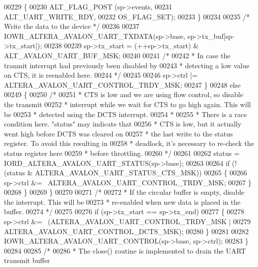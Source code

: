 \begin{DoxyCode}
00229       \{ 
00230         ALT_FLAG_POST (sp->events, 
00231                        ALT_UART_WRITE_RDY,
00232                        OS\_FLAG\_SET);
00233       \}
00234 
00235       \textcolor{comment}{/* Write the data to the device */}
00236 
00237       IOWR_ALTERA_AVALON_UART_TXDATA(sp->base, sp->tx_buf[sp->tx_start]);
00238 
00239       sp->tx_start = (++sp->tx_start) & ALT_AVALON_UART_BUF_MSK;
00240 
00241       \textcolor{comment}{/*}
00242 \textcolor{comment}{       * In case the tranmit interrupt had previously been disabled by }
00243 \textcolor{comment}{       * detecting a low value on CTS, it is reenabled here.}
00244 \textcolor{comment}{       */} 
00245 
00246       sp->ctrl |= ALTERA_AVALON_UART_CONTROL_TRDY_MSK;
00247     \}
00248     \textcolor{keywordflow}{else}
00249     \{
00250       \textcolor{comment}{/*}
00251 \textcolor{comment}{       * CTS is low and we are using flow control, so disable the transmit}
00252 \textcolor{comment}{       * interrupt while we wait for CTS to go high again. This will be }
00253 \textcolor{comment}{       * detected using the DCTS interrupt.}
00254 \textcolor{comment}{       *}
00255 \textcolor{comment}{       * There is a race condition here. "status" may indicate that }
00256 \textcolor{comment}{       * CTS is low, but it actually went high before DCTS was cleared on }
00257 \textcolor{comment}{       * the last write to the status register. To avoid this resulting in}
00258 \textcolor{comment}{       * deadlock, it's necessary to re-check the status register here}
00259 \textcolor{comment}{       * before throttling.}
00260 \textcolor{comment}{       */}
00261  
00262       status = IORD_ALTERA_AVALON_UART_STATUS(sp->base); 
00263 
00264       \textcolor{keywordflow}{if} (!(status & ALTERA\_AVALON\_UART\_STATUS\_CTS\_MSK))
00265       \{
00266         sp->ctrl &= ~ALTERA_AVALON_UART_CONTROL_TRDY_MSK;
00267       \}
00268     \}
00269   \}
00270 
00271   \textcolor{comment}{/*}
00272 \textcolor{comment}{   * If the circular buffer is empty, disable the interrupt. This will be}
00273 \textcolor{comment}{   * re-enabled when new data is placed in the buffer.}
00274 \textcolor{comment}{   */}
00275 
00276   \textcolor{keywordflow}{if} (sp->tx_start == sp->tx_end)
00277   \{
00278     sp->ctrl &= ~(ALTERA_AVALON_UART_CONTROL_TRDY_MSK |
00279                     ALTERA_AVALON_UART_CONTROL_DCTS_MSK);
00280   \}
00281 
00282   IOWR_ALTERA_AVALON_UART_CONTROL(sp->base, sp->ctrl);
00283 \}
00284 
00285 \textcolor{comment}{/*}
00286 \textcolor{comment}{ * The close() routine is implemented to drain the UART transmit buffer}

\end{DoxyCode}
